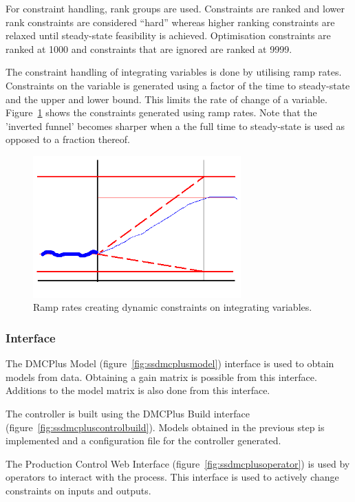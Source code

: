 For constraint handling, rank groups are used.
Constraints are ranked and lower rank constraints are considered ``hard'' whereas higher ranking constraints are relaxed until steady-state feasibility is achieved.
Optimisation constraints are ranked at 1000 and constraints that are ignored are ranked at 9999.

The constraint handling of integrating variables is done by utilising ramp rates.
Constraints on the variable is generated using a factor of the time to steady-state and the upper and lower bound.
This limits the rate of change of a variable.
Figure~\ref{fig:dmcplusramprates} shows the constraints generated using ramp rates.
Note that the 'inverted funnel' becomes sharper when a the full time to steady-state is used as opposed to a fraction thereof.

\begin{figure}[htbp]
  \centering
    \includegraphics[width=8cm]{graph/dmcplusramprate}
  \caption[DMCPlus ramp rate dynamic constraints]{Ramp rates creating dynamic constraints on integrating variables.}
  \label{fig:dmcplusramprates}
\end{figure}

\subsubsection{Interface}
The DMCPlus Model (figure~\ref{fig:ssdmcplusmodel}) interface is used to obtain models from data.
Obtaining a gain matrix is possible from this interface.
Additions to the model matrix is also done from this interface.

The controller is built using the DMCPlus Build interface (figure~\ref{fig:ssdmcpluscontrolbuild}).
Models obtained in the previous step is implemented and a configuration file for the controller generated.

The Production Control Web Interface (figure~\ref{fig:ssdmcplusoperator}) is used by operators to interact with the process.
This interface is used to actively change constraints on inputs and outputs.


